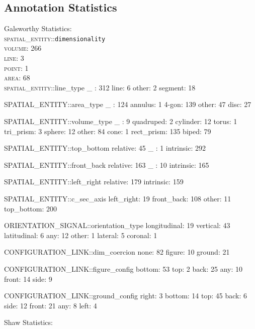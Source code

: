 \documentclass[11pt]{article}
\begin{document}
\begin{appendix}
    \appendixpage
    \section{Annotation Statistics} %
    \label{sec:annotation_statistics}
    Galsworthy Statistics:\\
    \textsc{spatial\_entity}::\texttt{dimensionality}\\
    \textsc{volume}: 266 \\
    \textsc{line}: 3 \\
    \textsc{point}: 1 \\
    \textsc{area}: 68 \\

    \iffalse
    \textsc{spatial\_entity}::line_type 
    _ : 312 
    line: 6 
    other: 2 
    segment: 18 

    SPATIAL_ENTITY::area_type 
    _ : 124 
    annulus: 1 
    4-gon: 139 
    other: 47 
    disc: 27 

    SPATIAL_ENTITY::volume_type 
    _ : 9 
    quadruped: 2 
    cylinder: 12 
    torus: 1 
    tri_prism: 3 
    sphere: 12 
    other: 84 
    cone: 1 
    rect_prism: 135 
    biped: 79 

    SPATIAL_ENTITY::top_bottom 
    relative: 45 
    _ : 1 
    intrinsic: 292 

    SPATIAL_ENTITY::front_back 
    relative: 163 
    _ : 10 
    intrinsic: 165 

    SPATIAL_ENTITY::left_right 
    relative: 179 
    intrinsic: 159 



    SPATIAL_ENTITY::c_sec_axis 
    left_right: 19 
    front_back: 108 
    other: 11 
    top_bottom: 200 

    ORIENTATION_SIGNAL::orientation_type 
    longitudinal: 19 
    vertical: 43 
    latitudinal: 6 
    any: 12 
    other: 1 
    lateral: 5 
    coronal: 1 

    CONFIGURATION_LINK::dim_coercion 
    none: 82 
    figure: 10 
    ground: 21 

    CONFIGURATION_LINK::figure_config 
    bottom: 53 
    top: 2 
    back: 25 
    any: 10 
    front: 14 
    side: 9 

    CONFIGURATION_LINK::ground_config 
    right: 3 
    bottom: 14 
    top: 45 
    back: 6 
    side: 12 
    front: 21 
    any: 8 
    left: 4 


    Shaw Statistics:


\end{appendix}
\end{document}
